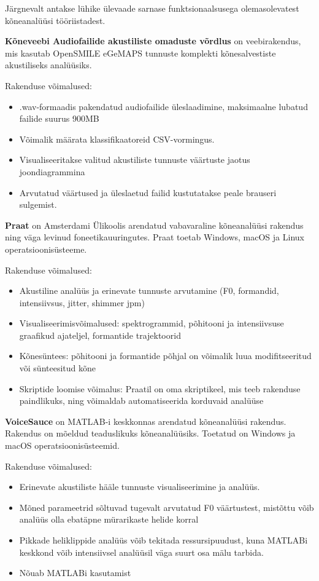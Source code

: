 Järgnevalt antakse lühike ülevaade sarnase funktsionaalsusega olemasolevatest kõneanalüüsi tööriistadest. 

\textbf{Kõneveebi Audiofailide akustiliste omaduste võrdlus} \cite{kõneveeb} on veebirakendus, mis kasutab OpenSMILE eGeMAPS tunnuste komplekti kõnesalvestiste akustiliseks analüüsiks.

Rakenduse võimalused:
\begin{itemize}
    \item .wav-formaadis pakendatud audiofailide üleslaadimine, maksimaalne lubatud failide suurus 900MB
    \item Võimalik määrata klassifikaatoreid CSV-vormingus.
    \item Visualiseeritakse valitud akustiliste tunnuste väärtuste jaotus joondiagrammina
    \item Arvutatud väärtused ja üleslaetud failid kustutatakse peale brauseri sulgemist.
\end{itemize} 

\textbf{Praat} \cite{praat} on Amsterdami Ülikoolis arendatud vabavaraline kõneanalüüsi rakendus ning väga levinud foneetikauuringutes. Praat toetab Windows, macOS ja Linux operatsioonisüsteeme.
 
Rakenduse võimalused:
\begin{itemize}
    \item Akustiline analüüs ja erinevate tunnuste arvutamine (F0, formandid, intensiivsus, jitter, shimmer jpm)
    \item Visualiseerimisvõimalused: spektrogrammid, põhitooni ja intensiivsuse graafikud ajateljel, formantide trajektoorid
    \item Kõnesüntees: põhitooni ja formantide põhjal on võimalik luua modifitseeritud või sünteesitud kõne
    \item Skriptide loomise võimalus: Praatil on oma skriptikeel, mis teeb rakenduse paindlikuks, ning võimaldab automatiseerida korduvaid analüüse
\end{itemize}

\textbf{VoiceSauce} \cite{voicesauce} on MATLAB-i keskkonnas arendatud kõneanalüüsi rakendus. Rakendus on mõeldud teaduslikuks kõneanalüüsiks. Toetatud on Windows ja macOS operatsioonisüsteemid.

Rakenduse võimalused:
\begin{itemize}
    \item Erinevate akustiliste hääle tunnuste visualiseerimine ja analüüs.
    \item Mõned parameetrid sõltuvad tugevalt arvutatud F0 väärtustest, mistõttu võib analüüs olla ebatäpne mürarikaste helide korral
    \item Pikkade heliklippide analüüs võib tekitada ressursipuudust, kuna MATLABi keskkond võib intensiivsel analüüsil väga suurt osa mälu tarbida.
    \item Nõuab MATLABi kasutamist
\end{itemize} 

